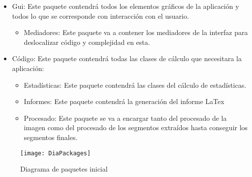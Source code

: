 \begin{itemize}
\item Gui:
Este paquete contendrá todos los elementos gráficos de la aplicación y todos lo que se corresponde con interacción con el usuario.
	\begin{itemize}
	\item Mediadores:
	Este paquete va a contener los mediadores de la interfaz para deslocalizar código y complejidad en esta.
	\end{itemize}
\item Código: Este paquete contendrá todas las clases de cálculo que necesitara la aplicación:
	\begin{itemize}
	\item Estadísticas:
	Este paquete contendrá las clases del cálculo de estadísticas.
	\item Informes:
	Este paquete contendrá la generación del informe LaTex
	\item Procesado:
	Este paquete se va a encargar tanto del procesado de la imagen 			como del procesado de los segmentos extraídos hasta conseguir los 		segmentos finales.
	\end{itemize}
\end{itemize}

\begin{figure}[h]
	\centering
	\texttt{[image: DiaPackages]}
	\caption{Diagrama de paquetes inicial}
	\label{fig:C.1.2}
\end{figure}

